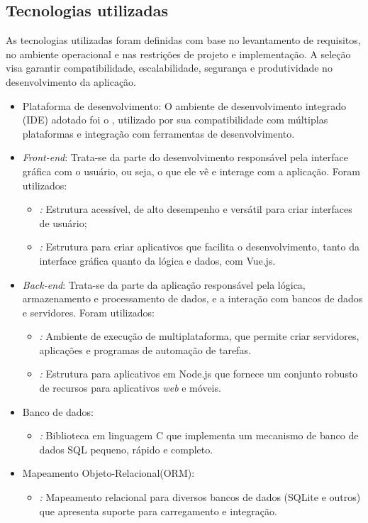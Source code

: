 \subsection {Tecnologias utilizadas}

As tecnologias utilizadas foram definidas com base no levantamento de requisitos, no ambiente operacional e nas restrições de projeto e implementação. A seleção visa garantir compatibilidade, escalabilidade, segurança e produtividade no desenvolvimento da aplicação.

\begin{itemize} 
    \item {Plataforma de desenvolvimento:} O ambiente de desenvolvimento integrado (IDE) adotado foi o \textit{ }, utilizado por sua compatibilidade com múltiplas plataformas e integração com ferramentas de desenvolvimento.
    \item {\textit{Front-end}:} Trata-se da parte do desenvolvimento responsável pela interface gráfica com o usuário, ou seja, o que ele vê e interage com a aplicação. Foram utilizados:
        \begin{itemize} 
        \item {\textit{:}} Estrutura \textit{} acessível, de alto desempenho e versátil para criar interfaces de usuário;
        \item {\textit{:}} Estrutura para criar aplicativos que facilita o desenvolvimento, tanto da interface gráfica quanto da lógica e dados, com Vue.js.
        \end{itemize}
    \item {\textit{Back-end}:} Trata-se da parte da aplicação responsável pela lógica, armazenamento e processamento de dados, e a interação com bancos de dados e servidores. Foram utilizados:
        \begin{itemize} 
        \item {\textit{:}} Ambiente de execução de multiplataforma, que permite criar servidores, aplicações e programas de automação de tarefas.
        \item {\textit{:}} Estrutura para aplicativos em Node.js que fornece um conjunto robusto de recursos para aplicativos \textit{web} e móveis.
        \end{itemize}
    \item {Banco de dados:}
        \begin{itemize} 
        \item {\textit{:}} Biblioteca em linguagem C que implementa um mecanismo de banco de dados SQL pequeno, rápido e completo.
        \end{itemize}
    \item {Mapeamento Objeto-Relacional(ORM):}
        \begin{itemize}     
        \item {\textit{:}} Mapeamento relacional para diversos bancos de dados (SQLite e outros) que apresenta suporte para carregamento e integração.
        \end{itemize}
\end{itemize}


